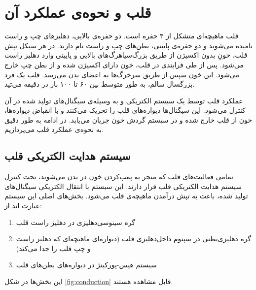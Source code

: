 \label{chap:lit}
\pagebreak

\section {قلب و نحوه‌ی عملکرد آن}
قلب ماهیچه‌ای متشکل از ۴ حفره است. دو حفره‌ی بالایی، دهلیزهای چپ و راست نامیده می‌شوند و دو حفره‌ی پایینی، بطن‌های چپ و راست نام دارند. در هر سیکل تپش قلب، خونِ بدون اکسیژن از طریق بزرگ‌سیاهرگ‌های بالایی و پایینی وارد دهلیز راست می‌شود. پس از طی فرایندی در قلب، خون دارای اکسیژن شده و از بطن چپ خارج می‌شود. این خون سپس از طریق سرخرگ‌ها به اعضای بدن می‌رسد. قلب یک فرد بزرگسال سالم، به طور متوسط بین ۶۰ تا ۱۰۰ بار در دقیقه می‌تپد. \cite{MayoClinic}

عملکرد قلب توسط یک سیستم الکتریکی و به وسیله‌ی سیگنال‌های تولید شده در آن کنترل می‌شود. این سیگنال‌ها دیواره‌های قلب را تحریک می‌کنند و با انقباض دیواره‌ها، خون از قلب خارج شده و در سیستم گردش خون جریان می‌یابد. در ادامه به طور دقیق به نحوه‌ی عملکرد قلب می‌پردازیم. 


\subsection {سیستم هدایت الکتریکی قلب}
تمامی فعالیت‌های قلب که منجر به پمپ‌کردن خون در بدن می‌شوند، تحت کنترل سیستم هدایت الکتریکی قلب  قرار دارند. این سیستم با انتقال الکتریکی سیگنال‌های تولید شده، باعث به تپش درآمدن ماهیچه‌ی قلب می‌شود. بخش‌های اصلی این سیستم عبارت اند از:

\begin{enumerate}
	\item گره سینوسی‌دهلیزی   در دهلیز 
	راست قلب
	\item گره دهلیزی‌بطنی   در سپتوم داخل‌دهلیزی قلب  (دیواره‌ای ماهیچه‌ای که دهلیز راست و چپ قلب را جدا می‌کند)
	\item سیستم هیس-پورکینژ  در دیواره‌های بطن‌های قلب
\end{enumerate}
این بخش‌ها در شکل \ref{fig:conduction} قابل مشاهده هستند.

